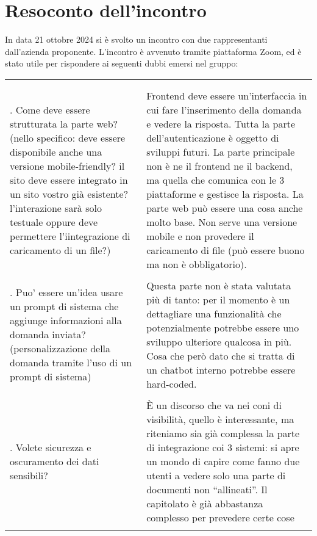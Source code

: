 \section{Resoconto dell'incontro}

In data 21 ottobre 2024 si è svolto un incontro con due rappresentanti dall'azienda proponente.
L'incontro è avvenuto tramite piattaforma Zoom, ed è stato utile per rispondere ai seguenti dubbi emersi nel gruppo:

\begingroup
\renewcommand{\ni}{\noindent}

  \vspace{0.5cm}

  \begin{tabular}{>{\justifying\arraybackslash}p{} >{\justifying\arraybackslash}p{}}
      \multicolumn{1}{c}{\textbf{Domande}} & \multicolumn{1}{c}{\textbf{Risposte}} \\ \\
      
      \ni 1. Come deve essere strutturata la parte web? (nello specifico: deve essere disponibile anche una versione mobile-friendly? il sito deve essere 
      integrato in un sito vostro già esistente?l'interazione sarà solo testuale oppure deve permettere l'iintegrazione di caricamento di un file?)
      & \ni Frontend deve essere un’interfaccia in cui fare l’inserimento della domanda e vedere la risposta.
      Tutta la parte dell’autenticazione è oggetto di sviluppi futuri.
      La parte principale non è ne il frontend ne il backend, ma quella che comunica con le 3 piattaforme e gestisce la risposta. La parte web può essere 
      una cosa anche molto base.
      Non serve una versione mobile e non provedere il caricamento di file (può essere buono ma non è obbligatorio). \\ \\
      
      \ni 2. Puo’ essere un’idea usare un prompt di sistema che aggiunge informazioni alla domanda inviata? (personalizzazione della domanda tramite l'uso 
      di un prompt di sistema)
      & \ni Questa parte non è stata valutata più di tanto: per il momento è un dettagliare una funzionalità che potenzialmente potrebbe essere uno
      sviluppo ulteriore qualcosa in più. Cosa che però dato che si tratta di un chatbot interno potrebbe essere hard-coded. \\ \\
      
      \ni 3. Volete sicurezza e oscuramento dei dati sensibili?
      & \ni È un discorso che va nei coni di visibilità, quello è interessante, ma riteniamo sia già complessa la parte di integrazione coi 3 sistemi:
      si apre un mondo di capire come fanno due utenti a vedere solo una parte di documenti non “allineati”.
      Il capitolato è già abbastanza complesso per prevedere certe cose \\ \\


\end{tabular}
